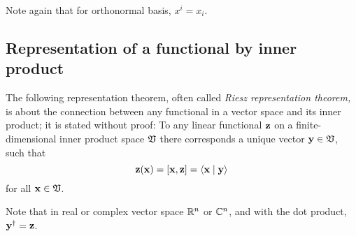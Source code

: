 Note again that for orthonormal basis,
$x^i=x_i$.


\subsection{Representation of a functional by inner product}
\label{2011-m-corr-bil-ip}
The following representation theorem,
often called
{\em Riesz representation theorem,}
 is about the connection between any functional
in a vector space and its inner product; it is stated without proof:
To any linear functional ${\bf z}$
on a finite-dimensional inner product space ${\frak V}$
there corresponds a unique vector   ${\bf y}\in {\frak V}$,
such that
\begin{equation}
{\bf z} ({\bf x}) =[{\bf x}, {\bf z}]= \langle {\bf x}\mid {\bf y}\rangle
\end{equation}
for all ${\bf x}\in {\frak V}$.

Note that in  real or complex vector space ${\Bbb R}^n$ or ${\Bbb C}^n$, and with the dot product,
 ${\bf y}^\dagger = {\bf z}$.


